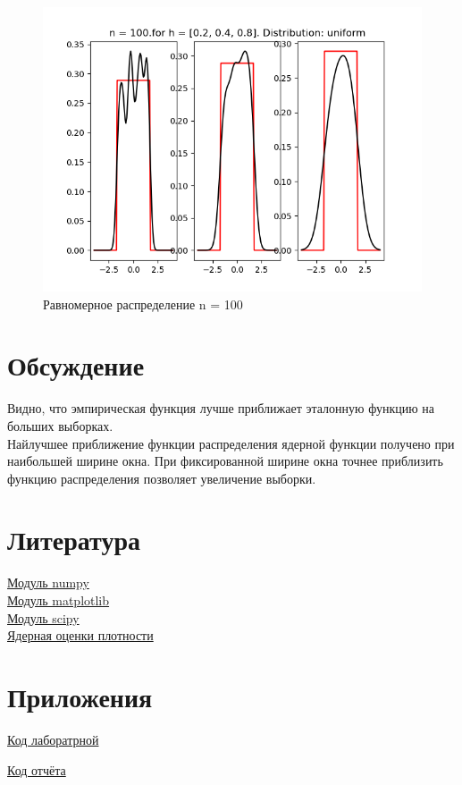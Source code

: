 \documentclass[a4]{article}
\begin{document}
\begin{center}
\begin{figure}[h!]
			\includegraphics[width=\textwidth]{uniformker100.png}
			\caption[Равномерное распределение n = 100]{Равномерное распределение n = 100}
		\end{figure}
		
	\end{center}
		
	\newpage
	\section{Обсуждение}
		Видно, что эмпирическая функция лучше приближает эталонную функцию на больших выборках.\\
		Найлучшее приближение функции распределения ядерной функции получено при наибольшей ширине окна. При фиксированной ширине окна точнее приблизить функцию распределения позволяет увеличение выборки.
	
	\section{Литература}
	
	\href{https://physics.susu.ru/vorontsov/language/numpy.html}{Модуль numpy}\\
	
	\href{https://matplotlib.org/}{Модуль matplotlib}\\
	
	\href{https://www.scipy.org/}{Модуль scipy}\\
	
	\href{https://ru.wikipedia.org/wiki/%D0%AF%D0%B4%D0%B5%D1%80%D0%BD%D0%B0%D1%8F_%D0%BE%D1%86%D0%B5%D0%BD%D0%BA%D0%B0_%D0%BF%D0%BB%D0%BE%D1%82%D0%BD%D0%BE%D1%81%D1%82%D0%B8}{Ядерная оценки плотности}\\
	
	\section{Приложения}
	
	\href{https://github.com/LuciusGen/Matstat/blob/master/Lab4/lab4.py}{Код лаборатрной}
	
	\href{https://github.com/LuciusGen/Matstat/blob/master/Lab4/lab4.tex}{Код отчёта}
	
\end{document}
